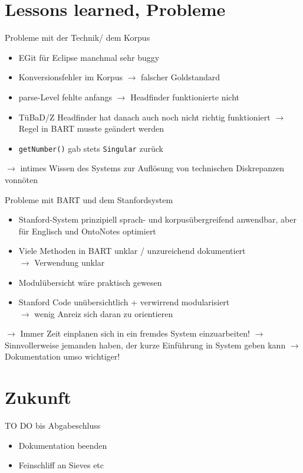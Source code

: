 \documentclass[11pt,a4paper]{beamer}
\begin{document}
\section{Lessons learned, Probleme}
\begin{frame}{Probleme mit der Technik/ dem Korpus}
\begin{itemize}
\item EGit für Eclipse manchmal sehr buggy
\item Konversionsfehler im Korpus $\rightarrow$ falscher Goldstandard
\item parse-Level fehlte anfangs $\rightarrow$ Headfinder funktionierte nicht
\item TüBaD/Z Headfinder hat danach auch noch nicht richtig funktioniert $\rightarrow$ Regel in BART musste geändert werden
\item \texttt{getNumber()} gab stets \texttt{Singular} zurück 
\end{itemize}
$\rightarrow$ intimes Wissen des Systems zur Auflösung von technischen Diskrepanzen vonnöten

\end{frame}

\begin{frame}{Probleme mit BART und dem Stanfordsystem}
\begin{itemize}
\item Stanford-System prinzipiell sprach- und korpusübergreifend anwendbar, aber für Englisch und OntoNotes optimiert
\item Viele Methoden in BART unklar / unzureichend dokumentiert \\$\rightarrow$  Verwendung unklar
\item Modulübersicht wäre praktisch gewesen
\item Stanford Code unübersichtlich + verwirrend modularisiert\\$\rightarrow$ wenig Anreiz sich daran zu orientieren
\end{itemize}
$\rightarrow$ Immer Zeit einplanen sich in ein fremdes System einzuarbeiten!
$\rightarrow$ Sinnvollerweise jemanden haben, der kurze Einführung in System geben kann
$\rightarrow$ Dokumentation umso wichtiger!
\end{frame}



\section{Zukunft}
\begin{frame}{TO DO bis Abgabeschluss}
\begin{itemize}
\item Dokumentation beenden
\item Feinschliff an Sieves etc
\end{itemize}
\end{frame}
\end{document}
